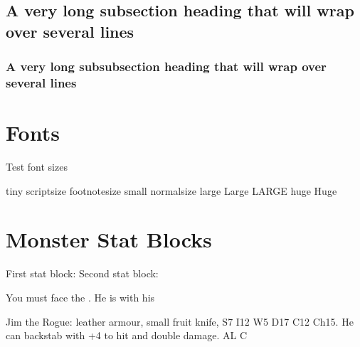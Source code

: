 \documentclass[a4paper,serif]{module}       %
\begin{document}
\subsection{A very long subsection heading that will wrap over several lines}

\subsubsection{A very long subsubsection heading that will wrap over several lines}

\section{Fonts}


Test font sizes

{\tiny tiny}
{\scriptsize scriptsize}
{\footnotesize footnotesize}
{\small small}
{\normalsize normalsize}
{\large large}
{\Large Large}
{\LARGE LARGE}
{\huge huge}
{\Huge Huge}

\section{Monster Stat Blocks}


First stat block:
Second stat block:

You must face the . 
He is with his 




\begin{statblockfreestyle}
Jim the Rogue: leather armour, small fruit knife, S7 I12 W5 D17 C12 Ch15. He can backstab with +4 to hit and double damage. AL C
\end{statblockfreestyle}
\end{document}
